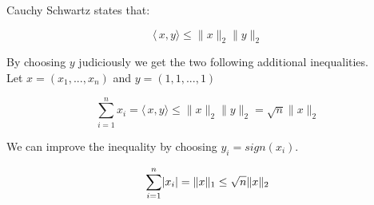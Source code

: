 \documentclass[paper=A4, fontsize=11pt]{scrartcl}
\let\originalleft\left
\let\originalright\right
\renewcommand{\left}{\mathopen{}\mathclose\bgroup\originalleft}
\renewcommand{\right}{\aftergroup\egroup\originalright}
\theoremstyle{remark}
\begin{document}
Cauchy Schwartz states that:

\begin{equation}
\langle\,x,y\rangle \leq \|x\|_{2}\|y\|_{2}
\end{equation}

By choosing $y$ judiciously we get the two following additional inequalities.
\\
Let $x = (x_{1}, ..., x_{n})$ and $y = (1, 1, ..., 1)$

\begin{equation}
\sum_{i=1}^{n} x_{i} = \langle\,x,y\rangle  \leq  \|x\|_{2}\|y\|_{2} = \sqrt{n}\|x\|_{2}
\end{equation}

We can improve the inequality by choosing $y_{i} = sign(x_{i})$. 

\begin{equation}
\sum_{i=1}^{n} \left|x_{i}\right| =  \|x\|_{1}\leq \sqrt{n}\|x\|_{2}
\end{equation}	

\end{document}
